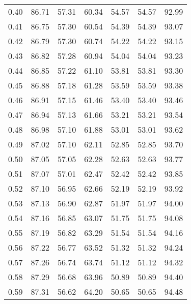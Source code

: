 \begin{tabular}{|c|c|c|c|c|c|c|}
      0.40 &     86.71 &     57.31 &      60.34 &   54.57 &      54.57 &         92.99 \\
      0.41 &     86.75 &     57.30 &      60.54 &   54.39 &      54.39 &         93.07 \\
      0.42 &     86.79 &     57.30 &      60.74 &   54.22 &      54.22 &         93.15 \\
      0.43 &     86.82 &     57.28 &      60.94 &   54.04 &      54.04 &         93.23 \\
      0.44 &     86.85 &     57.22 &      61.10 &   53.81 &      53.81 &         93.30 \\
      0.45 &     86.88 &     57.18 &      61.28 &   53.59 &      53.59 &         93.38 \\
      0.46 &     86.91 &     57.15 &      61.46 &   53.40 &      53.40 &         93.46 \\
      0.47 &     86.94 &     57.13 &      61.66 &   53.21 &      53.21 &         93.54 \\
      0.48 &     86.98 &     57.10 &      61.88 &   53.01 &      53.01 &         93.62 \\
      0.49 &     87.02 &     57.10 &      62.11 &   52.85 &      52.85 &         93.70 \\
      0.50 &     87.05 &     57.05 &      62.28 &   52.63 &      52.63 &         93.77 \\
      0.51 &     87.07 &     57.01 &      62.47 &   52.42 &      52.42 &         93.85 \\
      0.52 &     87.10 &     56.95 &      62.66 &   52.19 &      52.19 &         93.92 \\
      0.53 &     87.13 &     56.90 &      62.87 &   51.97 &      51.97 &         94.00 \\
      0.54 &     87.16 &     56.85 &      63.07 &   51.75 &      51.75 &         94.08 \\
      0.55 &     87.19 &     56.82 &      63.29 &   51.54 &      51.54 &         94.16 \\
      0.56 &     87.22 &     56.77 &      63.52 &   51.32 &      51.32 &         94.24 \\
      0.57 &     87.26 &     56.74 &      63.74 &   51.12 &      51.12 &         94.32 \\
      0.58 &     87.29 &     56.68 &      63.96 &   50.89 &      50.89 &         94.40 \\
      0.59 &     87.31 &     56.62 &      64.20 &   50.65 &      50.65 &         94.48 \\

\end{tabular}
